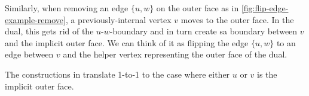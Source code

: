 Similarly, when removing an edge $\{u,w\}$ on the outer face as in \cref{fig:flip-edge-example-remove}, a previously-internal vertex $v$ moves to the outer face. In the dual, this gets rid of the $u$-$w$-boundary and in turn create sa boundary between $v$ and the implicit outer face. We can think of it as flipping the edge $\{u,w\}$ to an edge between $v$ and the helper vertex representing the outer face of the dual.

The constructions in  translate 1-to-1 to the case where either $u$ or $v$ is the implicit outer face.
